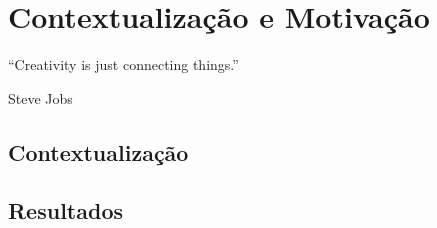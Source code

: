 \chapter{Contextualização e Motivação}

\begin{flushright}
	\begin{quotebox50}
		\large
		“Creativity is just connecting things.”

		\tcblower
		Steve Jobs
	\end{quotebox50}
\end{flushright}


\section{Contextualização}



\section{Resultados}

